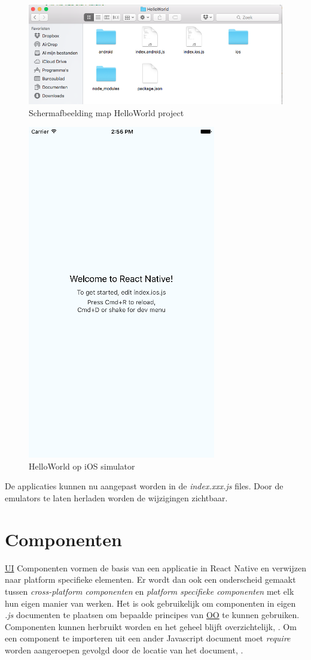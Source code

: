
\begin{figure}%
\centering
\includegraphics[width=.8\columnwidth]{img/HelloWorld.png}%
\caption{Schermafbeelding map HelloWorld project}%
\label{fig:map}%
\end{figure}

\begin{figure}%
\centering
\includegraphics[width=0.5\columnwidth]{img/simulator.png}%
\caption{HelloWorld op iOS simulator}%
\label{fig:simulator}%
\end{figure}

De applicaties kunnen nu aangepast worden in de \emph{index.xxx.js} files. Door de emulators te laten herladen worden de wijzigingen zichtbaar. \citep{getstarted:ReactNative}


\section{Componenten}
\hyperref[ui]{UI} Componenten vormen de basis van een applicatie in React Native en verwijzen naar platform specifieke elementen. Er wordt dan ook een onderscheid gemaakt tussen \emph{cross-platform componenten} en \emph{platform specifieke componenten} met elk hun eigen manier van werken. Het is ook gebruikelijk om componenten in eigen \emph{.js} documenten te plaatsen om bepaalde principes van \hyperref[oo]{OO} te kunnen gebruiken. Componenten kunnen herbruikt worden en het geheel blijft overzichtelijk, . Om een component te importeren uit een ander Javascript document moet \emph{require} worden aangeroepen gevolgd door de locatie van het document, . 

